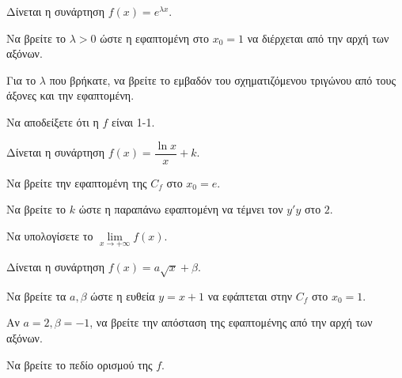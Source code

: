 \documentclass[11pt,a4paper,modern]{FFExercises}
\begin{document}
\askhsh
Δίνεται η συνάρτηση $ f(x)=e^{\lambda x} $.
\begin{alist}
    \item Να βρείτε το $ \lambda > 0 $ ώστε η εφαπτομένη στο $ x_0=1 $ να διέρχεται από την αρχή των αξόνων.
    \item Για το $ \lambda $ που βρήκατε, να βρείτε το εμβαδόν του σχηματιζόμενου τριγώνου από τους άξονες και την εφαπτομένη.
    \item Να αποδείξετε ότι η $ f $ είναι 1-1.
\end{alist}

\askhsh
Δίνεται η συνάρτηση $ f(x)=\dfrac{\ln x}{x} + k $.
\begin{alist}
    \item Να βρείτε την εφαπτομένη της $ C_f $ στο $ x_0=e $.
    \item Να βρείτε το $ k $ ώστε η παραπάνω εφαπτομένη να τέμνει τον $ y'y $ στο $ 2 $.
    \item Να υπολογίσετε το $ \lim\limits_{x\to +\infty} f(x) $.
\end{alist}

\askhsh
Δίνεται η συνάρτηση $ f(x)=a\sqrt{x} + \beta $.
\begin{alist}
    \item Να βρείτε τα $ a, \beta $ ώστε η ευθεία $ y=x+1 $ να εφάπτεται στην $ C_f $ στο $ x_0=1 $.
    \item Αν $ a=2, \beta=-1 $, να βρείτε την απόσταση της εφαπτομένης από την αρχή των αξόνων.
    \item Να βρείτε το πεδίο ορισμού της $ f $.
\end{alist}
\end{document}
